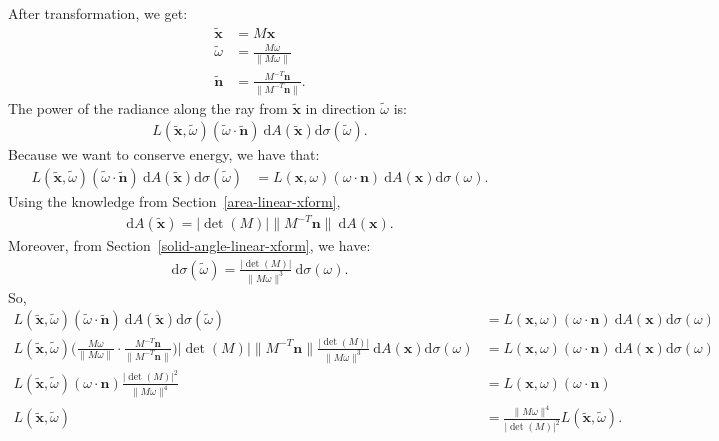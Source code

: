 \documentclass[10pt]{article}
\newcommand{\dee}{\mathrm{d}}
\newcommand{\ve}[1]{\mathbf{#1}}
\begin{document}
  After transformation, we get:
  \begin{align*}
    \tilde{\ve{x}} &= M \ve{x} \\
    \tilde{\omega} &= \frac{ M \omega }{ \| M \omega  \| } \\
    \tilde{\ve{n}} &= \frac{ M^{-T} \ve{n} }{ \| M^{-T} \ve{n} \| }.
  \end{align*}
  The power of the radiance along the ray from $\tilde{\ve{x}}$ in direction $\tilde{\omega}$ is:
  \begin{align*}
    L(\tilde{\ve{x}}, \tilde{\omega}) (\tilde{\omega} \cdot \tilde{\ve{n}})\ \dee A(\tilde{\ve{x}}) \dee\sigma(\tilde{\omega}).
  \end{align*}
  Because we want to conserve energy, we have that:
  \begin{align*}
    L(\tilde{\ve{x}}, \tilde{\omega}) (\tilde{\omega} \cdot \tilde{\ve{n}})\ \dee A(\tilde{\ve{x}}) \dee\sigma(\tilde{\omega})
    &= L(\ve{x}, \omega) (\omega \cdot \ve{n})\ \dee A(\ve{x}) \dee\sigma(\omega).
  \end{align*}
  Using the knowledge from Section~\ref{area-linear-xform},
  \begin{align*}
    \dee A(\tilde{\ve{x}}) = | \det(M) | \| M^{-T} \ve{n} \|\ \dee A(\ve{x}).
  \end{align*}
  Moreover, from Section~\ref{solid-angle-linear-xform}, we have:
  \begin{align*}
    \dee \sigma(\tilde{\omega}) = \frac{| \det(M) |}{\| M \omega \|^3} \ \dee \sigma(\omega).
  \end{align*}
  So,
  \begin{align*}
    L(\tilde{\ve{x}}, \tilde{\omega}) (\tilde{\omega} \cdot \tilde{\ve{n}})\ \dee A(\tilde{\ve{x}}) \dee\sigma(\tilde{\omega})
    &= L(\ve{x}, \omega) (\omega \cdot \ve{n})\ \dee A(\ve{x}) \dee\sigma(\omega) \\
    L(\tilde{\ve{x}}, \tilde{\omega}) \bigg( \frac{M\omega}{\| M \omega\|} \cdot \frac{M^{-T}\ve{n}}{\| M^{-T}\ve{n} \|} \bigg) | \det(M) | \| M^{-T} \ve{n} \| \frac{| \det(M) |}{\| M \omega \|^3} \ \dee A(\ve{x})\dee \sigma(\omega)
    &= L(\ve{x}, \omega) (\omega \cdot \ve{n})\ \dee A(\ve{x}) \dee\sigma(\omega) \\
    L(\tilde{\ve{x}}, \tilde{\omega}) (\omega \cdot \ve{n}) \frac{| \det(M) |^2}{\| M \omega \|^4}
    &= L(\ve{x}, \omega) (\omega \cdot \ve{n})\\
    L(\tilde{\ve{x}}, \tilde{\omega})
    &= \frac{\| M \omega \|^4}{| \det(M) |^2} L(\tilde{\ve{x}}, \tilde{\omega}).
  \end{align*}
\end{document}
